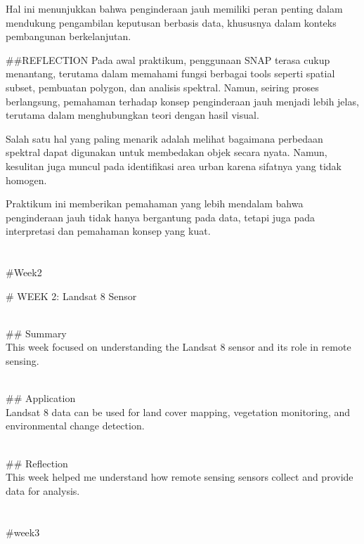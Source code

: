 \documentclass[
  letterpaper,
  DIV=11,
  numbers=noendperiod]{scrreprt}
\begin{document}
Hal ini menunjukkan bahwa penginderaan jauh memiliki peran penting dalam
mendukung pengambilan keputusan berbasis data, khususnya dalam konteks
pembangunan berkelanjutan.

\#\#REFLECTION Pada awal praktikum, penggunaan SNAP terasa cukup
menantang, terutama dalam memahami fungsi berbagai tools seperti spatial
subset, pembuatan polygon, dan analisis spektral. Namun, seiring proses
berlangsung, pemahaman terhadap konsep penginderaan jauh menjadi lebih
jelas, terutama dalam menghubungkan teori dengan hasil visual.

Salah satu hal yang paling menarik adalah melihat bagaimana perbedaan
spektral dapat digunakan untuk membedakan objek secara nyata. Namun,
kesulitan juga muncul pada identifikasi area urban karena sifatnya yang
tidak homogen.

Praktikum ini memberikan pemahaman yang lebih mendalam bahwa
penginderaan jauh tidak hanya bergantung pada data, tetapi juga pada
interpretasi dan pemahaman konsep yang kuat.


\chapter{}\label{section-1}

\#Week2

\# WEEK 2: Landsat 8 Sensor\\
\strut \\
\#\# Summary\\
This week focused on understanding the Landsat 8 sensor and its role in
remote sensing.\\
\strut \\
\#\# Application\\
Landsat 8 data can be used for land cover mapping, vegetation
monitoring, and environmental change detection.\\
\strut \\
\#\# Reflection\\
This week helped me understand how remote sensing sensors collect and
provide data for analysis.


\chapter{}\label{section-2}

\#week3

\end{document}
